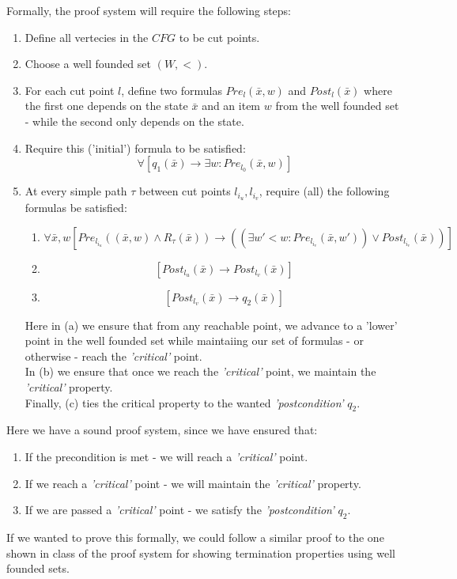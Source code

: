 \documentclass{article}
\begin{document}
Formally, the proof system will require the following steps:
\begin{enumerate}
    \item Define all vertecies in the $CFG$ to be cut points.
    \item Choose a well founded set $(W,<)$.
    \item For each cut point $l$, define two formulas $Pre_l(\bar{x},w)$ and $Post_l(\bar{x})$ where
    the first one depends on the state $\bar{x}$ and an item $w$ from the well founded set - while the second
    only depends on the state.
    \item Require this ('initial') formula to be satisfied:
    \[
        \forall\left[q_1(\bar{x})\rightarrow \exists w: Pre_{l_0}(\bar{x},w)\right]
    \]
    \item  At every simple path $\tau$ between cut points $l_{i_u}, l_{i_v}$,
    require (all) the following formulas be satisfied:
    \begin{enumerate}
        \item \[
            \forall\bar{x}, w
            \left[
                Pre_{l_{i_u}}((\bar{x},w)\wedge R_\tau(\bar{x}))\rightarrow
                ((\exists w'<w: Pre_{l_{i_v}}(\bar{x},w'))\vee Post_{l_{i_v}}(\bar{x}))
            \right]
        \]
        \item \[
            \left[Post_{l_u}(\bar{x})\rightarrow Post_{l_v}(\bar{x})\right]
        \]
        \item \[
            \left[Post_{l_v}(\bar{x})\rightarrow q_2(\bar{x})\right]    
        \]
    \end{enumerate}
    Here in (a) we ensure that from any reachable point,
    we advance to a 'lower' point in the well founded set while maintaiing
    our set of formulas - or otherwise - reach the \emph{'critical'} point.\\
    In (b) we ensure that once we reach the \emph{'critical'} point,
    we maintain the \emph{'critical'} property.\\
    Finally, (c) ties the critical property to the wanted \emph{'postcondition'} $q_2$.
\end{enumerate}

Here we have a sound proof system, since we have ensured that:
\begin{enumerate}
    \item If the precondition is met - we will reach a \emph{'critical'} point.
    \item If we reach a \emph{'critical'} point - we will maintain the \emph{'critical'} property.
    \item If we are passed a \emph{'critical'} point - we satisfy the \emph{'postcondition'} $q_2$.
\end{enumerate}
If we wanted to prove this formally, we could follow a similar proof to the one shown in class
of the proof system for showing termination properties using well founded sets.
\end{document}
